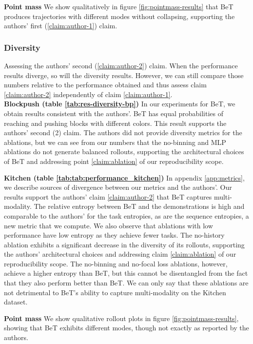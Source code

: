 \textbf{Point mass} We show qualitatively in figure \ref{fig:pointmass-results} that BeT produces trajectories with different modes without collapsing, supporting the authors' first (\ref{claim:author-1}) claim.

\subsubsection{Diversity}\label{results:diversity} Assessing the authors' second (\ref{claim:author-2}) claim.
When the performance results diverge, so will the diversity results.
However, we can still compare those numbers relative to the performance obtained and thus assess claim \ref{claim:author-2} independently of claim \ref{claim:author-1}.\\
\textbf{Blockpush (table \ref{tab:res-diversity-bp})} 
In our experiments for BeT, we obtain results consistent with the authors'.
BeT has equal probabilities of reaching and pushing blocks with different colors.
This result supports the authors' second (2) claim.
The authors did not provide diversity metrics for the ablations, but we can see from our numbers that the no-binning and MLP ablations do not generate balanced rollouts, supporting the architectural choices of BeT and addressing point \ref{claim:ablation} of our reproducibility scope.

\textbf{Kitchen (table \ref{tab:tab:performance_kitchen})}
In appendix \ref{app:metrics}, we describe sources of divergence between our metrics and the authors'.
Our results support the authors' claim \ref{claim:author-2} that BeT captures multi-modality.
The relative entropy between BeT and the demonstrations is high and comparable to the authors' for the task entropies, as are the sequence entropies, a new metric that we compute.
We also observe that ablations with low performance have low entropy as they achieve fewer tasks.
The no-history ablation exhibits a significant decrease in the diversity of its rollouts, supporting the authors' architectural choices and addressing claim \ref{claim:ablation} of our reproducibility scope.
The no-binning and no-focal loss ablations, however, achieve a higher entropy than BeT, but this cannot be disentangled from the fact that they also perform better than BeT.
We can only say that these ablations are not detrimental to BeT's ability to capture multi-modality on the Kitchen dataset.

\textbf{Point mass} We show qualitative rollout plots in figure \ref{fig:pointmass-results}, showing that BeT exhibits different modes, though not exactly as reported by the authors.


